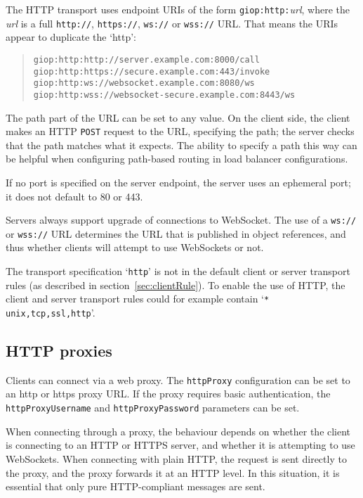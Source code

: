 \documentclass[11pt,oneside,a4paper]{book}
\newcommand{\code}[1]{\texttt{#1}}
\begin{document}
The HTTP transport uses endpoint URIs of the form
\code{giop:http:}\textit{url}, where the \textit{url} is a full
\code{http://}, \code{https://}, \code{ws://} or \code{wss://}
URL. That means the URIs appear to duplicate the `http':

\begin{quote}
  \code{giop:http:http://server.example.com:8000/call}\\
  \code{giop:http:https://secure.example.com:443/invoke}\\
  \code{giop:http:ws://websocket.example.com:8080/ws}\\
  \code{giop:http:wss://websocket-secure.example.com:8443/ws}
\end{quote}

\noindent The path part of the URL can be set to any value. On the
client side, the client makes an HTTP \code{POST} request to the URL,
specifying the path; the server checks that the path matches what it
expects. The ability to specify a path this way can be helpful when
configuring path-based routing in load balancer configurations.

If no port is specified on the server endpoint, the server uses an
ephemeral port; it does not default to 80 or 443.

Servers always support upgrade of connections to WebSocket. The use of
a \code{ws://} or \code{wss://} URL determines the URL that is
published in object references, and thus whether clients will attempt
to use WebSockets or not.

The transport specification `\code{http}' is not in the default client
or server transport rules (as described in
section~\ref{sec:clientRule}). To enable the use of HTTP, the client
and server transport rules could for example contain `\code{*
  unix,tcp,ssl,http}'.


\subsection{HTTP proxies}

Clients can connect via a web proxy. The \code{httpProxy}
configuration can be set to an http or https proxy URL. If the proxy
requires basic authentication, the \code{httpProxyUsername} and
\code{httpProxyPassword} parameters can be set.

When connecting through a proxy, the behaviour depends on whether the
client is connecting to an HTTP or HTTPS server, and whether it is
attempting to use WebSockets. When connecting with plain HTTP, the
request is sent directly to the proxy, and the proxy forwards it at an
HTTP level. In this situation, it is essential that only pure
HTTP-compliant messages are sent.
\end{document}
